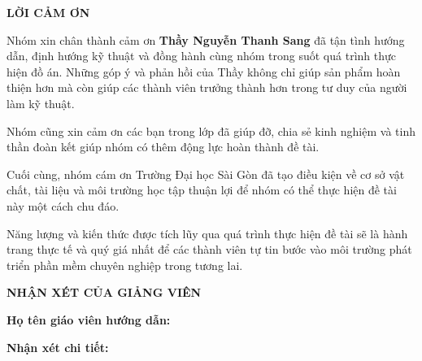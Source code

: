 \documentclass[11pt, a4paper]{article}
\begin{document}
\clearpage
{}

{}
\begin{center}
\Large\textbf{LỜI CẢM ƠN}
\end{center}

\vspace{1.5cm}

Nhóm xin chân thành cảm ơn \textbf{Thầy Nguyễn Thanh Sang} đã tận tình hướng dẫn, định hướng kỹ thuật và đồng hành cùng nhóm trong suốt quá trình thực hiện đồ án. Những góp ý và phản hồi của Thầy không chỉ giúp sản phẩm hoàn thiện hơn mà còn giúp các thành viên trưởng thành hơn trong tư duy của người làm kỹ thuật.

Nhóm cũng xin cảm ơn các bạn trong lớp đã giúp đỡ, chia sẻ kinh nghiệm và tinh thần đoàn kết giúp nhóm có thêm động lực hoàn thành đề tài.

Cuối cùng, nhóm cám ơn Trường Đại học Sài Gòn đã tạo điều kiện về cơ sở vật chất, tài liệu và môi trường học tập thuận lợi để nhóm có thể thực hiện đề tài này một cách chu đáo.

Năng lượng và kiến thức được tích lũy qua quá trình thực hiện đề tài sẽ là hành trang thực tế và quý giá nhất để các thành viên tự tin bước vào môi trường phát triển phần mềm chuyên nghiệp trong tương lai.

\clearpage

{}
\begin{center}
\Large\textbf{NHẬN XÉT CỦA GIẢNG VIÊN}
\end{center}

\vspace{1.5cm}

\noindent\textbf{Họ tên giáo viên hướng dẫn:}\hspace{1cm}\dotfill

\vspace{0.5cm}

\noindent\textbf{Nhận xét chi tiết:}

\vspace{0.3cm}

\noindent\dotfill

\noindent\dotfill
\end{document}
